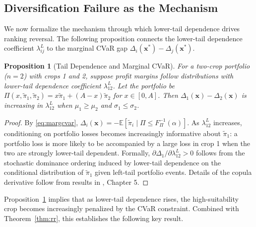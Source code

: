 \documentclass[12pt,review,authoryear]{elsarticle}
\numberwithin{equation}{section}
\newtheorem{proposition}[theorem]{Proposition}
\begin{document}
\subsection{Diversification Failure as the Mechanism}

We now formalize the mechanism through which lower-tail dependence drives
ranking reversal.  The following proposition connects the lower-tail
dependence coefficient $\lambda_{ij}^L$ to the marginal CVaR gap
$\Delta_i(\mathbf{x}^*) - \Delta_j(\mathbf{x}^*)$.

\begin{proposition}[Tail Dependence and Marginal CVaR]
\label{prop:ltd_margcvar}
For a two-crop portfolio ($n = 2$) with crops 1 and 2, suppose profit
margins follow distributions with lower-tail dependence coefficient
$\lambda_{12}^L$.  Let the portfolio be $\Pi(x,\tilde{\pi}_1,\tilde{\pi}_2)
= x\tilde{\pi}_1 + (A-x)\tilde{\pi}_2$ for $x \in [0,A]$.  Then
$\Delta_1(\mathbf{x}) - \Delta_2(\mathbf{x})$ is increasing in $\lambda_{12}^L$
when $\mu_1 \geq \mu_2$ and $\sigma_1 \leq \sigma_2$.
\end{proposition}

\begin{proof}
By \eqref{eq:margcvar}, $\Delta_i(\mathbf{x}) = -\mathbb{E}[\tilde{\pi}_i \mid\Pi \leq F_\Pi^{-1}(\alpha)]$.  As $\lambda_{12}^L$ increases,
conditioning on portfolio losses becomes increasingly informative about
$\tilde{\pi}_1$: a portfolio loss is more likely to be accompanied by a
large loss in crop 1 when the two are strongly lower-tail dependent.
Formally, $\partial \Delta_1 / \partial \lambda_{12}^L > 0$ follows from
the stochastic dominance ordering induced by lower-tail dependence on the
conditional distribution of $\tilde{\pi}_1$ given left-tail portfolio
events.  Details of the copula derivative follow from results in
\citet{Nelsen2006}, Chapter 5.
\end{proof}

Proposition~\ref{prop:ltd_margcvar} implies that as lower-tail dependence
rises, the high-suitability crop becomes increasingly penalized by the
CVaR constraint.  Combined with Theorem~\ref{thm:rr}, this establishes
the following key result.
\end{document}
